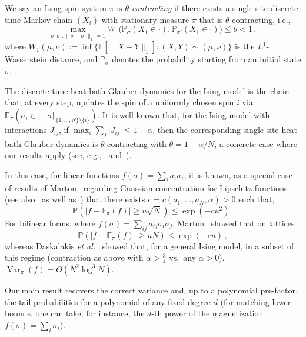 \documentclass[reqno,11pt]{amsart}
\numberwithin{equation}{section}
\renewcommand{\restriction}{\mathord{\upharpoonright}}
\theoremstyle{definition}{
\newtheorem{example}[theorem]{Example}
\newtheorem{definition}[theorem]{Definition}
\newtheorem*{definition*}{Definition}
\newtheorem{problem}[theorem]{Problem}
\newtheorem{question}[theorem]{Question}
\newtheorem{remark}[theorem]{Remark}
}
\newcommand{\E}{\mathbb E}
\renewcommand{\P}{\mathbb P}
\DeclareMathOperator{\var}{Var}
\begin{document}
\begin{definition*}
We say an Ising spin system $\pi$  is \emph{$\theta$-contracting} if there exists a single-site discrete-time Markov chain $(X_t)$  with stationary measure $\pi$ that is $\theta$-contracting, i.e.,
\[\max_{\sigma,\sigma':\|\sigma-\sigma'\|_1 =1} W_1\Big(\P_{\sigma}(X_1\in\cdot), \P_{\sigma'}(X_1\in\cdot)\Big) \leq \theta < 1\,,
\]
where $W_1(\mu,\nu):= \inf\{\E[\|X-Y\|_1] : (X,Y)\sim(\mu,\nu)\} $ is the $L^1$-Wasserstein distance, and $\P_\sigma$ denotes the probability starting from an initial state $\sigma$.
\end{definition*} 

The discrete-time heat-bath Glauber dynamics for the Ising model is the chain that, at every step, updates the spin of a uniformly chosen spin $i$ via $\P_\pi(\sigma_i\in\cdot \mid \sigma\restriction_{\{1,\ldots,N\}\setminus \{i\}})$.
It is well-known that, for the Ising model with interactions $J_{ij}$, if $\max_i\sum_{j} |J_{ij}| \leq 1 -\alpha$, then the corresponding single-site heat-bath Glauber dynamics is $\theta$-contracting with $\theta = 1 - \alpha/N$, a concrete case where our results apply (see, e.g.,~\cite[\S8]{Georgii11} and~\cite[\S14.2]{LPW09}).


In this case, for linear functions  $f(\sigma)=\sum_i a_i \sigma_i$, it is known, as a special case of results of Marton~\cite{Marton96} regarding Gaussian concentration for Lipschitz functions (see also~\cite{Samson00} as well as~\cite{Chazottes07,kontorovich08,Kulske03,Luczak08})  that there exists $c=c(a_1,\ldots,a_N,\alpha)>0$ such that,
\[ \P(|f-\E_\pi(f)|\geq u \sqrt{N}) \leq \exp(-c u^2)\,.\]
For bilinear forms, where $f(\sigma) = \sum_{ij} a_{ij} \sigma_i \sigma_j$, Marton~\cite{Marton03} showed that on lattices
\[ \P(|f-\E_\pi(f)|\geq u N) \leq \exp(-c u)\,,\]
whereas Daskalakis \emph{et al.}~\cite{DDK} showed that, for a general Ising model, in a subset of this regime (contraction as above with $\alpha>\frac34$ vs.\ any $\alpha>0$), $\var_\pi(f) =O(N^2\log^3 N)$.

Our main result recovers the correct variance and, up to a polynomial pre-factor, the tail probabilities for a polynomial of any fixed degree $d$ (for matching lower bounds, one can take, for instance,  the $d$-th power of  the magnetization $f(\sigma)=\sum_i \sigma_i$).
\end{document}
